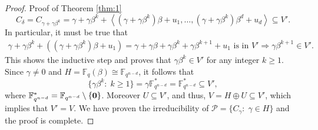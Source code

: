 \documentclass[10pt,a4paper]{amsart}
\def \F{{\mathbb F}}
\def \P{{\mathcal P}}
\def \be{\beta}
\def \de{\delta}
\def \ga{\gamma}
\def \la{\left\langle}
\def \o{\mbox{\bf 0} }
\def \ra{\right\rangle}
\begin{document}
\begin{proof}{Proof of Theorem \ref{thm:1}}
 \[C_\de= C_{\ga+\ga \be^k}=\ga+\ga \be^k+ \la (\ga+\ga \be^k)\be+u_1,\ldots,(\ga+\ga \be^k)\be^d+u_d\ra \subseteq V'.\]
In particular,  it must be true that
%
\begin{align}\label{eq:cond2}
\ga+\ga \be^k+\left((\ga+\ga \be^k)\be+u_1\right) =
\ga+\ga\be+\ga \be^k+\ga \be^{k+1}+u_1 \mbox{ is in } V'\Longrightarrow \ga \be^{k+1}\in V' .
\end{align}
%
This shows the inductive step and proves that $\ga \be^k\in V' $ for any integer $k\geq 1$.
Since $\ga\not=0$ and $H=\F_q(\beta) \cong \F_{q^{n-d}}$, it follows that 
\[\{\ga \be^k:\; k\geq 1\}=\ga\F_{q^{n-d}}^*=\F_{q^{n-d}}^*\subseteq V',\]
where $\F_{q^{n-d}}^*=\F_{q^{n-d}}\setminus\{\o\}$. 
Moreover $U\subseteq V'$, and thus, $V=H\oplus U\subseteq V'$, which implies that $V'=V$. We have proven the irreducibility of $\P=\{C_\ga:\; \ga\in H\}$ and the proof is complete.
\end{proof} 
\end{document}
